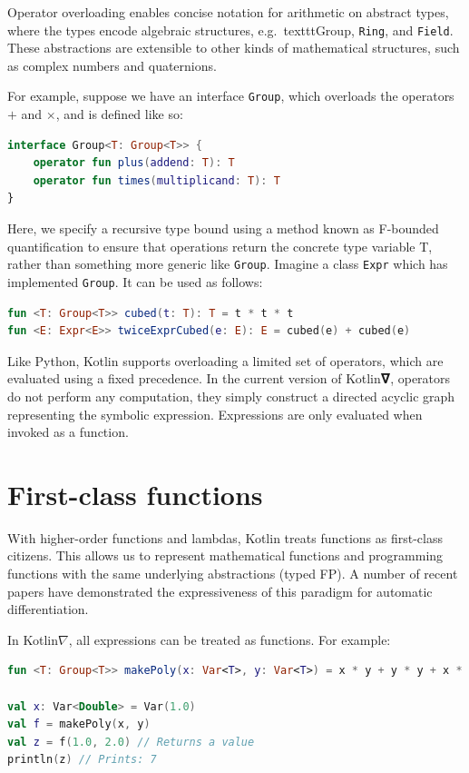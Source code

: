 \documentclass[12pt,initial,twoside,maitrise]{dms}
\numberwithin{equation}{section}
\numberwithin{table}{chapter}
\numberwithin{figure}{chapter}
\begin{document}
Operator overloading enables concise notation for arithmetic on abstract types, where the types encode algebraic structures, e.g.\ texttt{Group}, \texttt{Ring}, and \texttt{Field}. These abstractions are extensible to other kinds of mathematical structures, such as complex numbers and quaternions.

For example, suppose we have an interface \texttt{Group}, which overloads the operators $+$ and $\times$, and is defined like so:

\begin{lstlisting}[caption={Simple code listing.}, language=Kotlin]
interface Group<T: Group<T>> {
    operator fun plus(addend: T): T
    operator fun times(multiplicand: T): T
}
\end{lstlisting}

Here, we specify a recursive type bound using a method known as F-bounded quantification to ensure that operations return the concrete type variable T, rather than something more generic like \texttt{Group}. Imagine a class \texttt{Expr} which has implemented \texttt{Group}. It can be used as follows:

\begin{lstlisting}[caption={Simple code listing.}, language=Kotlin]
fun <T: Group<T>> cubed(t: T): T = t * t * t
fun <E: Expr<E>> twiceExprCubed(e: E): E = cubed(e) + cubed(e)
\end{lstlisting}

Like Python, Kotlin supports overloading a limited set of operators, which are evaluated using a fixed precedence. In the current version of Kotlin𝛁, operators do not perform any computation, they simply construct a directed acyclic graph representing the symbolic expression. Expressions are only evaluated when invoked as a function.

\section{First-class functions}

With higher-order functions and lambdas, Kotlin treats functions as first-class citizens. This allows us to represent mathematical functions and programming functions with the same underlying abstractions (typed FP). A number of recent papers have demonstrated the expressiveness of this paradigm for automatic differentiation.

In Kotlin$\nabla$, all expressions can be treated as functions. For example:

\begin{lstlisting}[caption={Simple code listing.}, language=Kotlin]
fun <T: Group<T>> makePoly(x: Var<T>, y: Var<T>) = x * y + y * y + x * x

val x: Var<Double> = Var(1.0)
val f = makePoly(x, y)
val z = f(1.0, 2.0) // Returns a value
println(z) // Prints: 7
\end{lstlisting}
\end{document}
